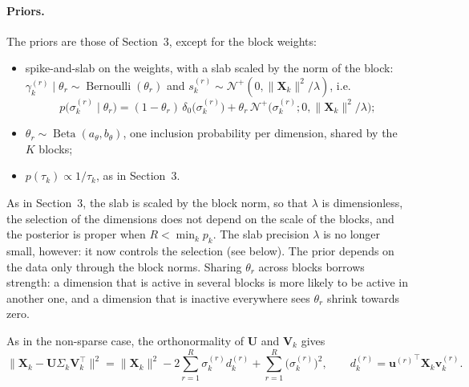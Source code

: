 \documentclass[11pt]{article}
\DeclareMathOperator{\Bern}{Bernoulli}
\DeclareMathOperator{\Be}{Beta}
\newcommand{\X}{\mathbf{X}}
\newcommand{\U}{\mathbf{U}}
\newcommand{\V}{\mathbf{V}}
\newcommand{\uu}{\mathbf{u}}
\newcommand{\vv}{\mathbf{v}}
\begin{document}
 
\paragraph{Priors.}The priors are those of Section~3, except for the block weights:
\begin{itemize}
  \item spike-and-slab on the weights, with a slab scaled by the norm of the block:
        $\gamma_k^{(r)}\mid\theta_r\sim\Bern(\theta_r)$ and $s_k^{(r)}\sim\mathcal N^+(0,\|\X_k\|^2/\lambda)$, i.e.\
        \[
          p\bigl(\sigma_k^{(r)}\mid\theta_r\bigr)=(1-\theta_r)\,\delta_0\bigl(\sigma_k^{(r)}\bigr)+\theta_r\,\mathcal N^+\bigl(\sigma_k^{(r)};0,\|\X_k\|^2/\lambda\bigr);
        \]
  \item $\theta_r\sim\Be(a_\theta,b_\theta)$, one inclusion probability per dimension, shared by the $K$ blocks;
  \item $p(\tau_k)\propto1/\tau_k$, as in Section~3.
\end{itemize}
As in Section~3, the slab is scaled by the block norm, so that $\lambda$ is dimensionless, the selection of the dimensions does not depend on the scale of the blocks, and the posterior is proper when $R<\min_kp_k$. The slab precision $\lambda$ is no longer small, however: it now controls the selection (see below). The prior depends on the data only through the block norms.
Sharing $\theta_r$ across blocks borrows strength: a dimension that is active in several blocks is more likely
to be active in another one, and a dimension that is inactive everywhere sees $\theta_r$ shrink towards zero.

As in the non-sparse case, the orthonormality of $\U$ and $\V_k$ gives
\begin{equation}
  \bigl\|\X_k-\U\Sigma_k\V_k^\intercal\bigr\|^2=\|\X_k\|^2-2\sum_{r=1}^R\sigma_k^{(r)}d_k^{(r)}+\sum_{r=1}^R\bigl(\sigma_k^{(r)}\bigr)^2,
  \qquad d_k^{(r)}={\uu^{(r)}}^\intercal\X_k\vv_k^{(r)} .
  \label{eq:expand2}
\end{equation}
\end{document}
